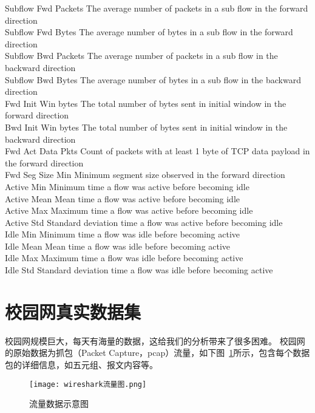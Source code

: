 Subflow Fwd Packets		The average number of packets in a sub flow in the forward direction \\
Subflow Fwd Bytes		The average number of bytes in a sub flow in the forward direction \\
Subflow Bwd Packets		The average number of packets in a sub flow in the backward direction \\
Subflow Bwd Bytes		The average number of bytes in a sub flow in the backward direction \\
Fwd Init Win bytes		The total number of bytes sent in initial window in the forward direction \\
Bwd Init Win bytes		The total number of bytes sent in initial window in the backward direction \\
Fwd Act Data Pkts		Count of packets with at least 1 byte of TCP data payload in the forward direction \\
Fwd Seg Size Min		Minimum segment size observed in the forward direction \\
Active Min			Minimum time a flow was active before becoming idle \\
Active Mean			Mean time a flow was active before becoming idle \\
Active Max			Maximum time a flow was active before becoming idle \\
Active Std			Standard deviation time a flow was active before becoming idle \\
Idle Min			Minimum time a flow was idle before becoming active \\
Idle Mean			Mean time a flow was idle before becoming active \\
Idle Max			Maximum time a flow was idle before becoming active \\
Idle Std			Standard deviation time a flow was idle before becoming active \\

\section{校园网真实数据集}

校园网规模巨大，每天有海量的数据，这给我们的分析带来了很多困难。
校园网的原始数据为抓包（Packet Capture，pcap）流量，如下图~\ref{fig:wireshark}所示，包含每个数据包的详细信息，如五元组、报文内容等。

\begin{figure}
    \centering
    \texttt{[image: wireshark流量图.png]}
    \caption{流量数据示意图}
    \label{fig:wireshark}
  \end{figure}

